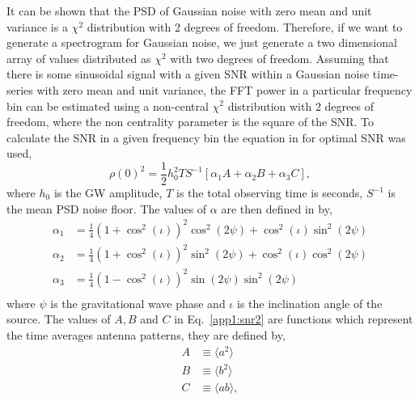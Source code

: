 It can be shown that the \gls{PSD} of Gaussian noise with zero mean and unit variance is a $\chi^2$ distribution with 2 degrees of freedom. Therefore, if we want to generate a spectrogram for Gaussian noise, we just generate a two dimensional array of values distributed as $\chi^2$ with two degrees of freedom.
Assuming that there is some sinusoidal signal with a given \gls{SNR} within a Gaussian noise time-series with zero mean and unit variance, the \gls{FFT} power in a particular frequency bin can be estimated using a non-central $\chi^2$ distribution with 2 degrees of freedom, where the non centrality parameter is the square of the \gls{SNR}. 
To calculate the \gls{SNR} in a given frequency bin the equation in \citep{prix2007SearchContinuous} for optimal \gls{SNR} was used,
\begin{equation}
	\label{app1:snr2}
    \rho(0)^2 = \frac{1}{2}h_0^2 T S^{-1} \left[ \alpha_1 A + \alpha_2 B + \alpha_3 C \right],
\end{equation}
where $h_0$ is the \gls{GW} amplitude, $T$ is the total observing time is seconds, $S^{-1}$ is the mean \gls{PSD} noise floor. The values of $\alpha$ are then defined in \citep{prix2007SearchContinuous} by,
\begin{equation}
\begin{split}
\alpha_1 &= \frac{1}{4}\left(1 + \cos^2 \left( \iota\right)  \right)^2 \cos^2\left( 2 \psi \right)  + \cos^2\left( \iota\right)  \sin^2 \left( 2\psi \right) \\
\alpha_2 &= \frac{1}{4}\left(1 + \cos^2 \left( \iota \right) \right)^2 \sin^2\left( 2 \psi \right)  + \cos^2\left( \iota\right)  \cos^2 \left( 2\psi \right) \\
\alpha_3 &= \frac{1}{4}\left(1 - \cos^2 \left( \iota\right)  \right)^2 \sin\left( 2 \psi \right) \sin^2 \left( 2\psi \right) \\
\end{split}
\end{equation}
where $\psi$ is the gravitational wave phase and $\iota$ is the inclination angle of the source.
The values of $A,B$ and $C$ in Eq.~\ref{app1:snr2} are functions which represent the time averages antenna patterns, they are defined by,
\begin{equation}
\begin{split}
A &\equiv \langle a^2 \rangle \\
B &\equiv \langle b^2 \rangle \\
C &\equiv \langle ab \rangle, \\
\end{split}
\end{equation}
